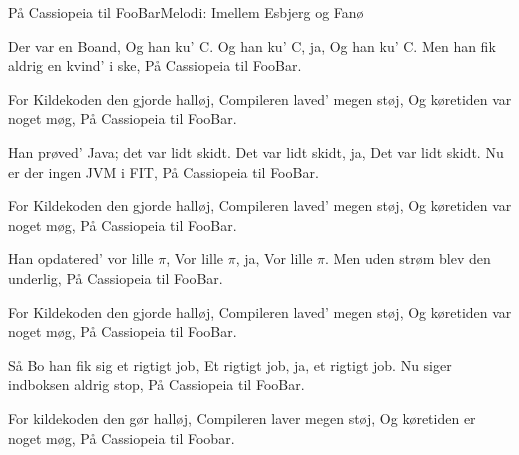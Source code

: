 \begin{sang}{På Cassiopeia til FooBar}{Melodi: Imellem Esbjerg og Fanø}
\begin{vers}
Der var en Boand,
Og han ku' C.
Og han ku' C, ja,
Og han ku' C.
Men han fik aldrig en kvind' i ske,
På Cassiopeia til FooBar.
\end{vers}

\begin{omkvaed}
For Kildekoden den gjorde halløj,
Compileren laved' megen støj,
Og køretiden var noget møg,
På Cassiopeia til FooBar.
\end{omkvaed}

\begin{vers}
Han prøved' Java; det var lidt skidt.
Det var lidt skidt, ja,
Det var lidt skidt.
Nu er der ingen JVM i FIT,
På Cassiopeia til FooBar.
\end{vers}

\begin{omkvaed}
For Kildekoden den gjorde halløj,
Compileren laved' megen støj,
Og køretiden var noget møg,
På Cassiopeia til FooBar.
\end{omkvaed}

\begin{vers}
Han opdatered' vor lille $\pi$,
Vor lille $\pi$, ja,
Vor lille $\pi$.
Men uden strøm blev den underlig,
På Cassiopeia til FooBar.
\end{vers}

\begin{omkvaed}
For Kildekoden den gjorde halløj,
Compileren laved' megen støj,
Og køretiden var noget møg,
På Cassiopeia til FooBar.
\end{omkvaed}

\begin{vers}
Så Bo han fik sig et rigtigt job,
Et rigtigt job, ja,
et rigtigt job.
Nu siger indboksen aldrig stop,
På Cassiopeia til FooBar.
\end{vers}

\begin{vers}
For kildekoden den gør halløj,
Compileren laver megen støj,
Og køretiden er noget møg,
På Cassiopeia til Foobar.

\end{vers}
\laps
\end{sang}
